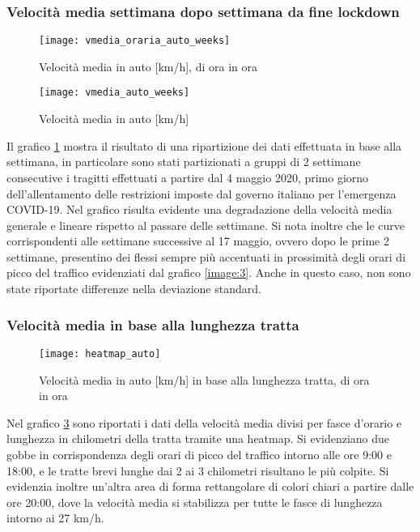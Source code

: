 \subsubsection{Velocità media settimana dopo settimana da fine lockdown}

\begin{figure}[H]
\texttt{[image: vmedia\_oraria\_auto\_weeks]}
\caption{Velocità media in auto [km/h], di ora in ora}
\label{image:5}
\end{figure}

\begin{figure}[H]
	\texttt{[image: vmedia\_auto\_weeks]}
	\caption{Velocità media in auto [km/h]}
	\label{image:27}
\end{figure}

Il grafico \ref{image:5} mostra il risultato di una ripartizione dei dati effettuata in base alla settimana, in particolare sono stati partizionati a gruppi di 2 settimane consecutive i tragitti effettuati a partire dal 4 maggio 2020, primo giorno dell'allentamento delle restrizioni imposte dal governo italiano per l'emergenza COVID-19\cite{dpcm26aprile}. Nel grafico risulta evidente una degradazione della velocità media generale e lineare rispetto al passare delle settimane. Si nota inoltre che le curve corrispondenti alle settimane successive al 17 maggio, ovvero dopo le prime 2 settimane, presentino dei flessi sempre più accentuati in prossimità degli orari di picco del traffico evidenziati dal grafico \ref{image:3}. Anche in questo caso, non sono state riportate differenze nella deviazione standard.

\subsubsection{Velocità media in base alla lunghezza tratta}

\begin{figure}[H]
\texttt{[image: heatmap\_auto]}
\caption{Velocità media in auto [km/h] in base alla lunghezza tratta, di ora in ora}
\label{image:6}
\end{figure}

Nel grafico \ref{image:6} sono riportati i dati della velocità media divisi per fasce d'orario e lunghezza in chilometri della tratta tramite una heatmap. Si evidenziano due gobbe in corrispondenza degli orari di picco del traffico intorno alle ore 9:00 e 18:00, e le tratte brevi lunghe dai 2 ai 3 chilometri risultano le più colpite. Si evidenzia inoltre un'altra area di forma rettangolare di colori chiari a partire dalle ore 20:00, dove la velocità media si stabilizza per tutte le fasce di lunghezza intorno ai 27 km/h.

